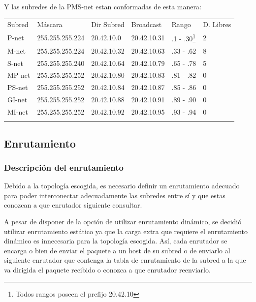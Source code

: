 \documentclass[]{article}
\begin{document}
Y las subredes de la PMS-net estan conformadas de esta manera:

\begin{longtable}[c]{@{}llllll@{}}
\toprule\addlinespace
Subred & Máscara & Dir Subred & Broadcast & Rango & D. Libres
\\\addlinespace
\midrule\endhead
P-net & 255.255.255.224 & 20.42.10.0 & 20.42.10.31 & .1 - .30\footnote{Todos
  rangos poseen el prefijo 20.42.10} & 2
\\\addlinespace
M-net & 255.255.255.224 & 20.42.10.32 & 20.42.10.63 & .33 - .62 & 8
\\\addlinespace
S-net & 255.255.255.240 & 20.42.10.64 & 20.42.10.79 & .65 - .78 & 5
\\\addlinespace
MP-net & 255.255.255.252 & 20.42.10.80 & 20.42.10.83 & .81 - .82 & 0
\\\addlinespace
PS-net & 255.255.255.252 & 20.42.10.84 & 20.42.10.87 & .85 - .86 & 0
\\\addlinespace
GI-net & 255.255.255.252 & 20.42.10.88 & 20.42.10.91 & .89 - .90 & 0
\\\addlinespace
MI-net & 255.255.255.252 & 20.42.10.92 & 20.42.10.95 & .93 - .94 & 0
\\\addlinespace
\bottomrule
\end{longtable}

\subsection{Enrutamiento}\label{enrutamiento}

\subsubsection{Descripción del
enrutamiento}\label{descripciuxf3n-del-enrutamiento}

Debido a la topología escogida, es necesario definir un enrutamiento
adecuado para poder interconectar adecuadamente las subredes entre sí y
que estas conozcan a que enrutador siguiente consultar.

A pesar de disponer de la opción de utilizar enrutamiento dinámico, se
decidió utilizar enrutamiento estático ya que la carga extra que
requiere el enrutamiento dinámico es innecesaria para la topología
escogida. Así, cada enrutador se encarga o bien de enviar el paquete a
un host de su subred o de enviarlo al siguiente enrutador que contenga
la tabla de enrutamiento de la subred a la que va dirigida el paquete
recibido o conozca a que enrutador reenviarlo.
\end{document}
